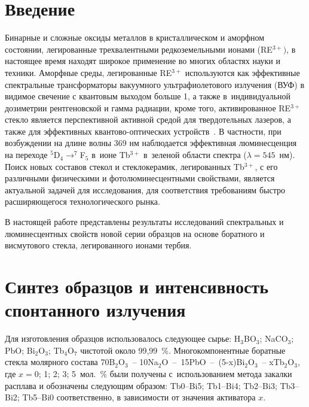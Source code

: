 \documentclass[press]{vestnik}
\begin{document}

\date{5-06-2024}

\maketitle[1.03]

\section*{Введение}

Бинарные и сложные оксиды металлов в кристаллическом и аморфном состоянии, 
легированные трехвалентными редкоземельными ионами (RE$^{3+})$, в настоящее 
время находят широкое применение во многих областях науки и техники. 
Аморфные среды, легированные RE$^{3+}$ используются как эффективные 
спектральные трансформаторы вакуумного ультрафиолетового излучения (ВУФ) в 
видимое свечение с квантовым выходом больше 1, а также в~индивидуальной 
дозиметрии рентгеновской и гамма радиации, кроме того, активированное 
RE$^{3+}$ стекло является перспективной активной средой для твердотельных 
лазеров, а также для эффективных квантово-оптических устройств~\cite{B01,B02,B03,B04,B05}. В 
частности, при возбуждении на длине волны 369 нм наблюдается эффективная 
люминесценция на переходе $^{5}$D$_{4}\to^{7}$F$_{5}$ в~ионе Tb$^{3+}$ 
в~зеленой области спектра ($\lambda = 545$~нм). Поиск новых составов 
стекол и стеклокерамик, легированных Tb$^{3+}$, с его различными физическими 
и фотолюминесцентными свойствами, является актуальной задачей для 
исследования, для соответствия требованиям быстро расширяющегося 
технологического рынка.

В настоящей работе представлены результаты исследований спектральных и 
люминесцентных свойств новой серии образцов на основе боратного и 
висмутового стекла, легированного ионами тербия.

\section{Синтез образцов и интенсивность спонтанного излучения}

Для изготовления образцов использовалось следующее сырье: H$_{3}$BO$_{3}$; 
NaCO$_{3}$; PbO; Bi$_{2}$O$_{3}$; Tb$_{4}$O$_{7}$ чистотой около 99,99~{\%}. 
Многокомпонентные боратные стекла молярного состава 70B$_{2}$O$_{3}$~-- 10Na$_{2}$O~--~15PbO~--~(5-x)Bi$_{2}$O$_{3}$~-- xTb$_{2}$O$_{3}$, где $x=0$; 1; 2; 3; 5~мол.~{\%} были получены с~использованием метода закалки расплава и обозначены следующим образом: Tb0--Bi5; Tb1--Bi4; Tb2--Bi3; Tb3--Bi2; Tb5--Bi0 соответственно, в зависимости от значения активатора $x$.
\end{document}
